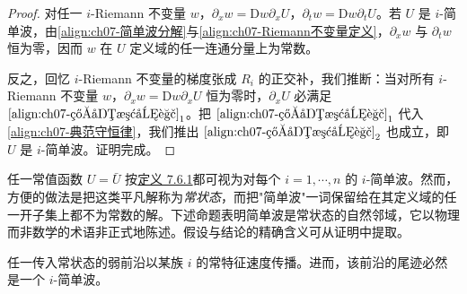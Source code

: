 \documentclass[../../main.tex]{subfiles}
\begin{document}
\begin{proof}
对任一 $i$-Riemann 不变量 $w$，$\partial_x w=\mathrm{D}w\partial_x U$，$\partial_t w=\mathrm{D}w\partial_t U$。若 $U$ 是 $i$-简单波，由\eqref{align:ch07-简单波分解}与\eqref{align:ch07-Riemann不变量定义}，$\partial_x w$ 与 $\partial_t w$ 恒为零，因而 $w$ 在 $U$ 定义域的任一连通分量上为常数。

反之，回忆 $i$-Riemann 不变量的梯度张成 $R_i$ 的正交补，我们推断：当对所有 $i$-Riemann 不变量 $w$，$\partial_x w=\mathrm{D}w\partial_x U$ 恒为零时，$\partial_x U$ 必满足 $\eqref{align:ch07-简单波分解}_1$。把 $\eqref{align:ch07-简单波分解}_1$ 代入\eqref{align:ch07-典范守恒律}，我们推出 $\eqref{align:ch07-简单波分解}_2$ 也成立，即 $U$ 是 $i$-简单波。证明完成。
\end{proof}

任一常值函数 $U=\bar{U}$ 按\hyperref[definition:ch07-i简单波]{定义 7.6.1}都可视为对每个 $i=1,\cdots,n$ 的 $i$-简单波。然而，方便的做法是把这类平凡解称为\emph{常状态}，而把"简单波"一词保留给在其定义域的任一开子集上都不为常数的解。下述命题表明简单波是常状态的自然邻域，它以物理而非数学的术语非正式地陈述。假设与结论的精确含义可从证明中提取。

\begin{theorem}\label{theorem:ch07-弱前沿后简单波}
任一传入常状态的弱前沿以某族 $i$ 的常特征速度传播。进而，该前沿的尾迹必然是一个 $i$-简单波。
\end{theorem}
\end{document}
